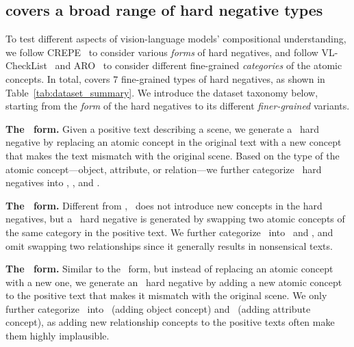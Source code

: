 \subsection{\method covers a broad range of hard negative types}
\label{sec:hn_types}

To test different aspects of vision-language models' compositional understanding, we follow CREPE~\cite{ma2022crepe} to consider various \emph{forms} of hard negatives, and follow VL-CheckList~\cite{zhao2022vl} and ARO~\cite{yuksekgonul2023when} to consider different fine-grained \emph{categories} of the atomic concepts.
In total, \method covers $7$ fine-grained types of hard negatives, as shown in Table~\ref{tab:dataset_summary}.
We introduce the dataset taxonomy below, starting from the \emph{form} of the hard negatives to its different \emph{finer-grained} variants.



\textbf{The \replace\ form.}
Given a positive text describing a scene, we generate a \replace\ hard negative by replacing an atomic concept in the original text with a new concept that makes the text mismatch with the original scene.
Based on the type of the atomic concept---object, attribute, or relation---we further categorize \replace\ hard negatives into \replaceobj, \replaceatt, and \replacerel.

\textbf{The \swap\ form.} Different from \replace, \swap\ does not introduce new concepts in the hard negatives, but a \swap\ hard negative is generated by swapping two atomic concepts of the same category in the positive text. We further categorize \swap\ into \swapobj\ and \swapatt, and omit swapping two relationships since it generally results in nonsensical texts.

\textbf{The \add\ form.} Similar to the \replace\ form, but instead of replacing an atomic concept with a new one, we generate an \add\ hard negative by adding a new atomic concept to the positive text that makes it mismatch with the original scene.
We only further categorize \add\ into \addobj~(adding object concept) and \addatt~(adding attribute concept), as adding new relationship concepts to the positive texts often make them highly implausible.


